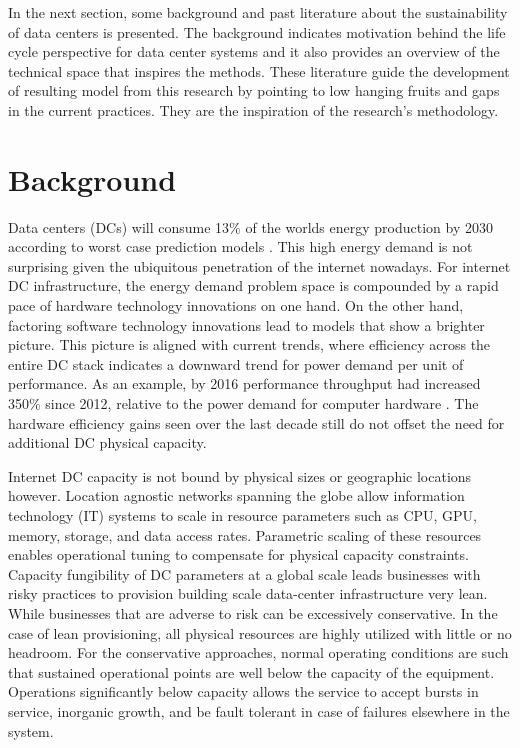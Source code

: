    In the next section, some background and past literature about the sustainability of data centers is presented. The background indicates motivation behind the life cycle perspective for data center systems and it also provides an overview of the technical space that inspires the methods. These literature guide the development of resulting model from this research by pointing to low hanging fruits and gaps in the current practices. They are the inspiration of the research's methodology. 

\section{Background}

    Data centers (DCs) will consume 13\% of the worlds energy production by 2030 according to worst case prediction models \cite{andrae15}. This high energy demand is not surprising given the ubiquitous penetration of the internet nowadays. For internet DC infrastructure, the energy demand problem space is compounded by a rapid pace of hardware technology innovations on one hand. On the other hand, factoring software technology innovations lead to models that show a brighter picture. This picture is aligned with current trends, where efficiency across the entire DC stack indicates a downward trend for power demand per unit of performance. As an example, by 2016 performance throughput had increased 350\% since 2012, relative to the power demand for computer hardware \cite{GoogleEnvRpt}.  The hardware efficiency gains seen over the last decade still do not offset the need for additional DC physical capacity.
    
    Internet DC capacity is not bound by physical sizes or geographic locations however. Location agnostic networks spanning the globe allow information technology (IT) systems to scale in resource parameters such as CPU, GPU, memory, storage, and data access rates. Parametric scaling of these resources enables operational tuning to compensate for physical capacity constraints. Capacity fungibility of DC parameters at a global scale leads businesses with risky practices to provision building scale data-center infrastructure very lean. While businesses that are adverse to risk can be excessively conservative. In the case of lean provisioning, all physical resources are highly utilized with little or no headroom. For the conservative approaches, normal operating conditions are such that sustained operational points are well below the capacity of the equipment. Operations significantly below capacity allows the service to accept bursts in service, inorganic  growth, and be fault tolerant in case of failures elsewhere in the system. 
    
